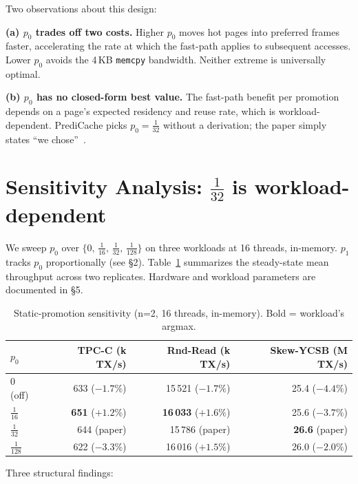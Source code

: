 \documentclass[10pt,twocolumn]{article}
\begin{document}
\noindent
Two observations about this design:

\textbf{(a) $p_0$ trades off two costs.}  Higher $p_0$ moves hot pages
into preferred frames faster, accelerating the rate at which the
fast-path applies to subsequent accesses.  Lower $p_0$ avoids the
4\,KB \texttt{memcpy} bandwidth.  Neither extreme is universally optimal.

\textbf{(b) $p_0$ has no closed-form best value.}  The fast-path benefit
per promotion depends on a page's expected residency and reuse rate,
which is workload-dependent.  PrediCache picks $p_0 = \tfrac{1}{32}$
without a derivation; the paper simply states ``we
chose''~\cite[\S5.1]{zinsmeister2026predictive}.

\section{Sensitivity Analysis: $\tfrac{1}{32}$ is workload-dependent}

We sweep $p_0$ over $\{0,\,\tfrac{1}{16},\,\tfrac{1}{32},\,\tfrac{1}{128}\}$
on three workloads at 16 threads, in-memory.  $p_1$ tracks $p_0$
proportionally (see \S2).  Table~\ref{tab:sweep} summarizes the steady-state
mean throughput across two replicates.  Hardware and workload parameters
are documented in \S5.

\begin{table}[h]
\centering\small
\caption{Static-promotion sensitivity (n=2, 16 threads, in-memory).
  Bold = workload's argmax.}
\label{tab:sweep}
\begin{tabular}{lrrr}
\toprule
 $p_0$ & TPC-C (k TX/s) & Rnd-Read (k TX/s) & Skew-YCSB (M TX/s) \\
\midrule
$0$ (off)   & 633 ($-1.7\%$) & 15\,521 ($-1.7\%$) & 25.4 ($-4.4\%$) \\
$\tfrac{1}{16}$ & \textbf{651} ($+1.2\%$) & \textbf{16\,033} ($+1.6\%$) & 25.6 ($-3.7\%$) \\
$\tfrac{1}{32}$ & 644 (paper) & 15\,786 (paper) & \textbf{26.6} (paper) \\
$\tfrac{1}{128}$ & 622 ($-3.3\%$) & 16\,016 ($+1.5\%$) & 26.0 ($-2.0\%$) \\
\bottomrule
\end{tabular}
\end{table}

\noindent
Three structural findings:
\end{document}
